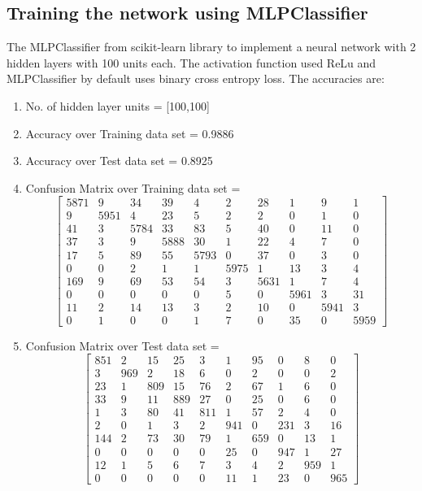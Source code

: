 \documentclass[11pt]{article}
\begin{document}
\subsection{Training the network using MLPClassifier}
The MLPClassifier from scikit-learn library to implement a neural network with 2 hidden layers with 100 units each. The activation function used ReLu and MLPClassifier by default uses binary cross entropy loss. The accuracies are:
\begin{enumerate}
\item No. of hidden layer units = [100,100]
\item Accuracy over Training data set = 0.9886
\item Accuracy over Test data set = 0.8925
\item Confusion Matrix over Training data set = 
\begin{equation}
  \begin{bmatrix}
5871 & 9 & 34 & 39 & 4 & 2 & 28 & 1 & 9 & 1\\
9 & 5951 & 4 & 23 & 5 & 2 & 2 & 0 & 1 & 0\\
41 & 3 & 5784 & 33 & 83 & 5 & 40 & 0 & 11 & 0\\
37 & 3 & 9 & 5888 & 30 & 1 & 22 & 4 & 7 & 0\\
17 & 5 & 89 & 55 & 5793 & 0 & 37 & 0 & 3 & 0\\
0 & 0 & 2 & 1 & 1 & 5975 & 1 & 13 & 3 & 4\\
169 & 9 & 69 & 53 & 54 & 3 & 5631 & 1 & 7 & 4\\
0 & 0 & 0 & 0 & 0 & 5 & 0 & 5961 & 3 & 31\\
11 & 2 & 14 & 13 & 3 & 2 & 10 & 0 & 5941 & 3\\
0 & 1 & 0 & 0 & 1 & 7 & 0 & 35 & 0 & 5959
  \end{bmatrix}
\end{equation}
\item Confusion Matrix over Test data set = 
\begin{equation}
  \begin{bmatrix}
851 & 2 & 15 & 25 & 3 & 1 & 95 & 0 & 8 & 0\\
3 & 969 & 2 & 18 & 6 & 0 & 2 & 0 & 0 & 2\\
23 & 1 & 809 & 15 & 76 & 2 & 67 & 1 & 6 & 0\\
33 & 9 & 11 & 889 & 27 & 0 & 25 & 0 & 6 & 0\\
1 & 3 & 80 & 41 & 811 & 1 & 57 & 2 & 4 & 0\\
2 & 0 & 1 & 3 & 2 & 941 & 0 & 231 & 3 & 16\\
144 & 2 & 73 & 30 & 79 & 1 & 659 & 0 & 13 & 1\\
0 & 0 & 0 & 0 & 0 & 25 & 0 & 947 & 1 & 27\\
12 & 1 & 5 & 6 & 7 & 3 & 4 & 2 & 959 & 1\\
0 & 0 & 0 & 0 & 0 & 11 & 1 & 23 & 0 & 965
  \end{bmatrix}
\end{equation}
\end{enumerate}
\end{document}
